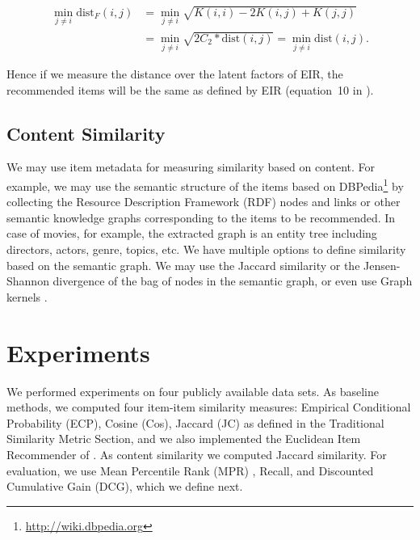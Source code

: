 \documentclass[preprint]{sig-alternate-05-2015}
\begin{document}
\begin{equation}
\nonumber
\begin{split}
\min_{j \neq i} \text{dist}_F(i,j) &= \min_{j \neq i} \sqrt{K(i,i) - 2 K(i,j) + K(j,j)} \\
                   &= \min_{j \neq i} \sqrt{2C_2*\mbox{dist}(i,j)} = \min_{j \neq i} \mbox{dist}(i,j).
\end{split}
\end{equation}

Hence if we measure the distance over the latent factors of EIR, the recommended items will be the same as defined by EIR (equation~10 in \cite{koenigstein2013towards}).

\subsection{Content Similarity}

We may use item metadata for measuring similarity based on content.
For example, we may use the semantic structure of the items based on DBPedia\footnote{\url{http://wiki.dbpedia.org}} \cite{auer2007dbpedia} by collecting the 
Resource Description Framework (RDF) nodes and links or other semantic knowledge graphs corresponding to the items to be recommended.  %
In case of movies, for example, the extracted graph is an entity tree including directors, actors, genre, topics, etc. We have multiple options to define  similarity based on the semantic graph.
We may use the Jaccard similarity or the Jensen-Shannon divergence of the bag of nodes in the semantic graph, or even use Graph kernels \cite{losch2012graph}.

%
%

\section{Experiments}

We performed experiments on four publicly available data sets.
As baseline methods, we computed four item-item similarity measures: Empirical Conditional Probability (ECP), Cosine 
(Cos), Jaccard (JC) as defined in the Traditional Similarity Metric Section, 
and we also implemented the Euclidean Item Recommender of \cite{koenigstein2013towards}. 
As content similarity we computed Jaccard similarity. %
For evaluation, we use Mean Percentile Rank (MPR) \cite{koenigstein2013towards}, Recall, and Discounted Cumulative Gain (DCG), which we define next.
\end{document}
